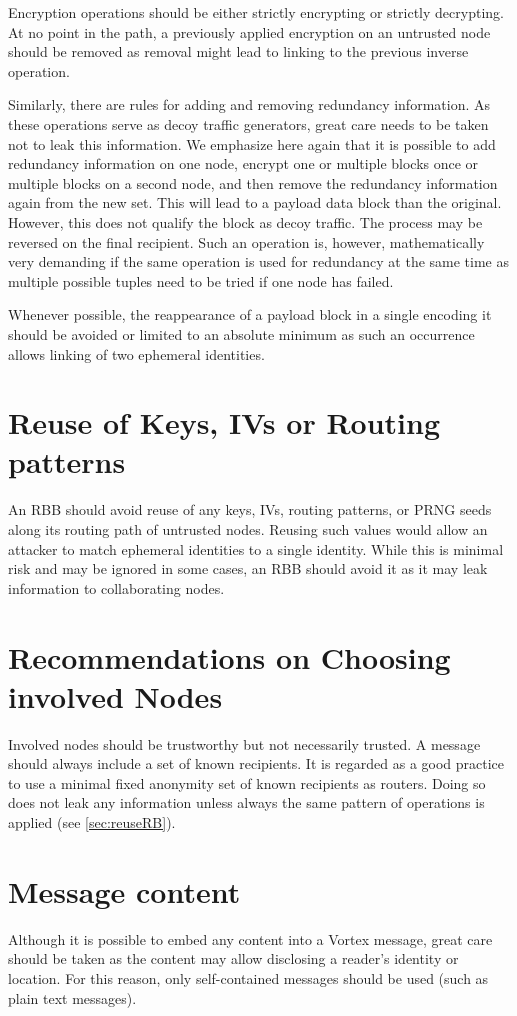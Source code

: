 Encryption operations should be either strictly encrypting or strictly decrypting. At no point in the path, a previously applied encryption on an untrusted node should be removed as removal might lead to linking to the previous inverse operation.

Similarly, there are rules for adding and removing redundancy information. As these operations serve as decoy traffic generators, great care needs to be taken not to leak this information. We emphasize here again that it is possible to add redundancy information on one node, encrypt one or multiple blocks once or multiple blocks on a second node, and then remove the redundancy information again from the new set. This will lead to a payload data block than the original. However, this does not qualify the block as decoy traffic. The process may be reversed on the final recipient. Such an operation is, however, mathematically very demanding if the same operation is used for redundancy at the same time as multiple possible tuples need to be tried if one node has failed.

Whenever possible, the reappearance of a payload block in a single encoding it should be avoided or limited to an absolute minimum as such an occurrence allows linking of two ephemeral identities.

\section{Reuse of Keys, IVs or Routing patterns}
An RBB should avoid reuse of any keys, IVs, routing patterns, or PRNG seeds along its routing path of untrusted nodes. Reusing such values would allow an attacker to match ephemeral identities to a single identity. While this is minimal risk and may be ignored in some cases, an RBB should avoid it as it may leak information to collaborating nodes.

\section{Recommendations on Choosing involved Nodes}
Involved nodes should be trustworthy but not necessarily trusted. A message should always include a set of known recipients. It is regarded as a good practice to use a minimal fixed anonymity set of known recipients as routers. Doing so does not leak any information unless always the same pattern of operations is applied (see \ref{sec:reuseRB}).

\section{Message content}
Although it is possible to embed any content into a Vortex message, great care should be taken as the content may allow disclosing a reader's identity or location. For this reason, only self-contained messages should be used (such as plain text messages).

